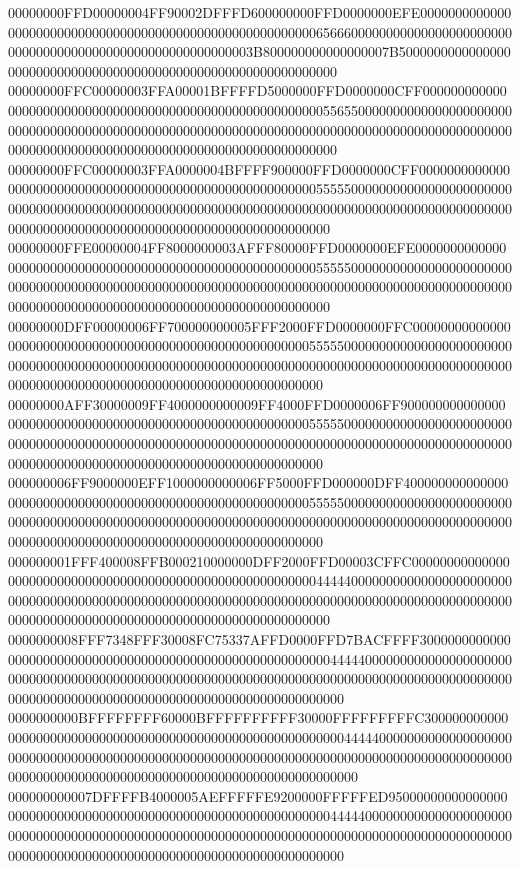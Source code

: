 00000000FFD00000004FF90002DFFFD600000000FFD0000000EFE000000000000000000000000000000000000000000000000000000000656660000000000000000000000000000000000000000000000000000000003B800000000000000007B500000000000000000000000000000000000000000000000000000000000000
00000000FFC00000003FFA00001BFFFFD5000000FFD0000000CFF00000000000000000000000000000000000000000000000000000000055655000000000000000000000000000000000000000000000000000000000000000000000000000000000000000000000000000000000000000000000000000000000000000000000
00000000FFC00000003FFA0000004BFFFF900000FFD0000000CFF00000000000000000000000000000000000000000000000000000000055555000000000000000000000000000000000000000000000000000000000000000000000000000000000000000000000000000000000000000000000000000000000000000000000
00000000FFE00000004FF8000000003AFFF80000FFD0000000EFE00000000000000000000000000000000000000000000000000000000055555000000000000000000000000000000000000000000000000000000000000000000000000000000000000000000000000000000000000000000000000000000000000000000000
00000000DFF00000006FF700000000005FFF2000FFD0000000FFC00000000000000000000000000000000000000000000000000000000055555000000000000000000000000000000000000000000000000000000000000000000000000000000000000000000000000000000000000000000000000000000000000000000000
00000000AFF30000009FF4000000000009FF4000FFD0000006FF900000000000000000000000000000000000000000000000000000000055555000000000000000000000000000000000000000000000000000000000000000000000000000000000000000000000000000000000000000000000000000000000000000000000
000000006FF9000000EFF1000000000006FF5000FFD000000DFF400000000000000000000000000000000000000000000000000000000055555000000000000000000000000000000000000000000000000000000000000000000000000000000000000000000000000000000000000000000000000000000000000000000000
000000001FFF400008FFB000210000000DFF2000FFD00003CFFC000000000000000000000000000000000000000000000000000000000044444000000000000000000000000000000000000000000000000000000000000000000000000000000000000000000000000000000000000000000000000000000000000000000000
0000000008FFF7348FFF30008FC75337AFFD0000FFD7BACFFFF3000000000000000000000000000000000000000000000000000000000044444000000000000000000000000000000000000000000000000000000000000000000000000000000000000000000000000000000000000000000000000000000000000000000000
0000000000BFFFFFFFF60000BFFFFFFFFFF30000FFFFFFFFFC30000000000000000000000000000000000000000000000000000000000044444000000000000000000000000000000000000000000000000000000000000000000000000000000000000000000000000000000000000000000000000000000000000000000000
000000000007DFFFFB4000005AEFFFFFE9200000FFFFFED95000000000000000000000000000000000000000000000000000000000000044444000000000000000000000000000000000000000000000000000000000000000000000000000000000000000000000000000000000000000000000000000000000000000000000
